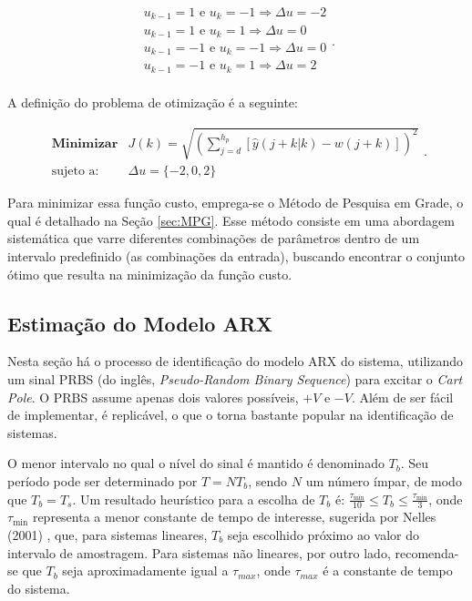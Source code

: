 \documentclass[12pt,           %
a4paper,                       %
openany,                       %
oneside,                       %
chapter=TITLE,                 %
english,                       %
spanish,                       %
brazil,                        %
sumario=tradicional]{abntex2}  %
\begin{document}
\begin{OnehalfSpace}
\begin{equation}
    \begin{matrix}
        u_{k-1} = 1 \text{ e } u_{k} = -1 \Rightarrow \Delta u = -2 \\
        u_{k-1} = 1 \text{ e } u_{k} = 1 \Rightarrow \Delta u = 0\\
        u_{k-1} = -1 \text{ e } u_{k} = -1 \Rightarrow \Delta u = 0\\
        u_{k-1} = -1 \text{ e } u_{k} = 1 \Rightarrow \Delta u = 2 \\
    \end{matrix}.
\end{equation}

A definição do problema de otimização é a seguinte:

\begin{equation}
    \begin{matrix}
        \textbf{Minimizar} & J(k) =\sqrt{(\sum_{j=d}^{h_p} [\hat{y}(j+k|k) - w(j+k)])^2}\\
        \text{sujeto a:} &  \Delta u = \{-2, 0, 2\}
    \end{matrix}.
\end{equation}

Para minimizar essa função custo, emprega-se o Método de Pesquisa em Grade, o qual é detalhado na Seção \ref{sec:MPG}. Esse método consiste em uma abordagem sistemática que varre diferentes combinações de parâmetros dentro de um intervalo predefinido (as combinações da entrada), buscando encontrar o conjunto ótimo que resulta na minimização da função custo.

\subsection{Estimação do Modelo ARX}
\label{subsec:GPCfor}  

Nesta seção há o processo de identificação do modelo ARX do sistema, utilizando um sinal PRBS (do inglês, \textit{Pseudo-Random Binary Sequence}) para excitar o \textit{Cart Pole}. O PRBS \cite{aguirre2004} assume apenas dois valores possíveis, $+V$ e $-V$. Além de ser fácil de implementar, é replicável, o que o torna bastante popular na identificação de sistemas. 

O menor intervalo no qual o nível do sinal é mantido é denominado $T_b$. Seu período pode ser determinado por $T = NT_b$, sendo $N$ um número ímpar, de modo que $T_b = T_s$. Um resultado heurístico para a escolha de $T_b$ é: $\frac{\tau_{\text{min}}}{10} \leq T_b \leq \frac{\tau_{\text{min}}}{3}$, onde $\tau_{\text{min}}$ representa a menor constante de tempo de interesse, sugerida por Nelles (2001) \cite{nelles}, que, para sistemas lineares, $T_b$ seja escolhido próximo ao valor do intervalo de amostragem. Para sistemas não lineares, por outro lado, recomenda-se que $T_b$ seja aproximadamente igual a $\tau_{max}$, onde $\tau_{max}$ é a constante de tempo do sistema.


\end{OnehalfSpace}
\end{document}
